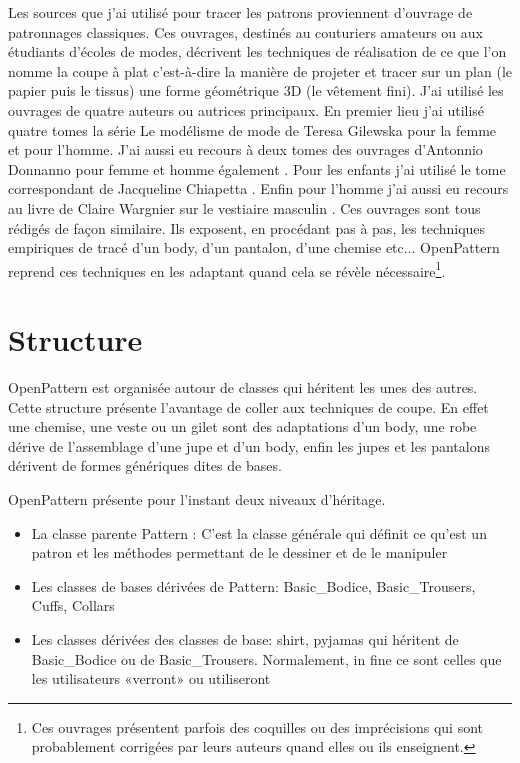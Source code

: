 \documentclass[11pt,a4paper]{article}
\begin{document}
Les sources que j'ai utilisé pour tracer les patrons proviennent d'ouvrage de patronnages classiques. Ces ouvrages, destinés au couturiers amateurs ou aux étudiants d'écoles de modes, décrivent les techniques de réalisation de ce que l'on nomme la coupe à plat c'est-à-dire  la manière de projeter et tracer sur un plan (le papier puis le tissus) une forme géométrique 3D (le vêtement fini). J'ai utilisé les ouvrages de quatre auteurs ou autrices principaux. 
En premier lieu j'ai utilisé quatre tomes la série Le modélisme de mode de Teresa Gilewska pour la femme et pour l'homme\cite{Gilewska1,Gilewska2,Gilewska4,Gilewska5}. J'ai aussi eu recours à deux tomes des ouvrages d'Antonnio Donnanno pour femme et homme également \cite{Donnanno2005,Donnanno2016}. Pour les enfants j'ai utilisé le tome correspondant de Jacqueline Chiapetta  \cite{Chiappetta1999}. Enfin pour l'homme j'ai aussi eu recours au livre de  Claire Wargnier sur le vestiaire masculin \cite{wargnier2012}. Ces ouvrages sont tous rédigés de façon similaire. Ils exposent, en procédant pas à pas, les techniques empiriques de tracé d'un body, d'un pantalon, d'une chemise etc...
OpenPattern reprend ces techniques en les adaptant quand cela se révèle nécessaire\footnote{Ces ouvrages présentent parfois des coquilles ou des imprécisions qui  sont probablement corrigées par leurs auteurs quand elles ou ils enseignent.}.

\section{Structure}

OpenPattern est organisée autour de classes qui héritent les unes des autres. Cette structure présente l'avantage de coller aux techniques de coupe. En effet une chemise, une veste ou un gilet sont des adaptations d'un body, une robe dérive de l'assemblage d'une jupe et d'un body, enfin les jupes et les pantalons dérivent de formes génériques dites de bases.

OpenPattern présente pour l'instant deux niveaux d'héritage.
\begin{itemize}
\item La classe parente Pattern : C'est la classe générale qui définit ce qu'est un patron et les méthodes permettant de le dessiner et de le manipuler
\item Les classes de bases dérivées de Pattern: Basic\_Bodice, Basic\_Trousers, Cuffs, Collars
\item Les classes dérivées des classes de base: shirt, pyjamas qui héritent de Basic\_Bodice ou de Basic\_Trousers. Normalement, in fine ce sont celles que les utilisateurs «verront» ou utiliseront	
\end{itemize}
\end{document}
